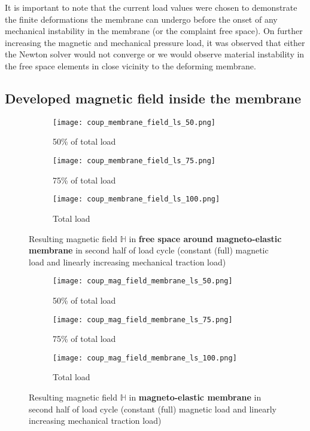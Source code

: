 It is important to note that the current load values were chosen to demonstrate the finite deformations the membrane can undergo before the onset of any mechanical instability in the membrane (or the complaint free space). On further increasing the magnetic and mechanical pressure load, it was observed that either the Newton solver would not converge or we would observe material instability in the free space elements in close vicinity to the deforming membrane. \par 

\subsection{Developed magnetic field inside the membrane}

\begin{figure}[h]
\centering
\begin{subfigure}{0.32\textwidth}
\centering
\texttt{[image: coup\_membrane\_field\_ls\_50.png]}
\caption{50\% of total load}
\label{fig:3.12.1}
\end{subfigure}
\begin{subfigure}{0.32\textwidth}
\centering
\texttt{[image: coup\_membrane\_field\_ls\_75.png]}
\caption{75\% of total load}
\label{fig:3.12.2}
\end{subfigure}
\begin{subfigure}{0.32\textwidth}
\centering
\texttt{[image: coup\_membrane\_field\_ls\_100.png]}
\caption{Total load}
\label{fig:3.12.3}
\end{subfigure}
\caption{Resulting magnetic field $\mathbb{H}$ in \textbf{free space around magneto-elastic membrane} in second half of load cycle (constant (full) magnetic load and linearly increasing mechanical traction load)}
\label{fig:3.12}
\end{figure}

\begin{figure}[h]
\centering
\begin{subfigure}{0.32\textwidth}
\centering
\texttt{[image: coup\_mag\_field\_membrane\_ls\_50.png]}
\caption{50\% of total load}
\label{fig:3.14.1}
\end{subfigure}
\begin{subfigure}{0.32\textwidth}
\centering
\texttt{[image: coup\_mag\_field\_membrane\_ls\_75.png]}
\caption{75\% of total load}
\label{fig:3.14.2}
\end{subfigure}
\begin{subfigure}{0.32\textwidth}
\centering
\texttt{[image: coup\_mag\_field\_membrane\_ls\_100.png]}
\caption{Total load}
\label{fig:3.14.3}
\end{subfigure}
\caption{Resulting magnetic field $\mathbb{H}$ in \textbf{magneto-elastic membrane} in second half of load cycle (constant (full) magnetic load and linearly increasing mechanical traction load)}
\label{fig:3.14}
\end{figure}

